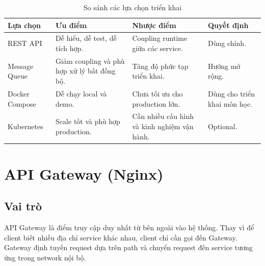 \documentclass[../main.tex]{subfiles}
\begin{document}
\begin{table}[H]
    \centering
    \caption{So sánh các lựa chọn triển khai}
    \label{tab:chapter4-architecture-discussion}
    \begin{tabular}{|p{}|p{}|p{}|p{}|}
        \hline
        \rowcolor{primary!35}
        \textbf{Lựa chọn} & \textbf{Ưu điểm} & \textbf{Nhược điểm} & \textbf{Quyết định} \\
        \hline
        REST API & Dễ hiểu, dễ test, dễ tích hợp. & Coupling runtime giữa các service. & Dùng chính. \\
        \hline
        Message Queue & Giảm coupling và phù hợp xử lý bất đồng bộ. & Tăng độ phức tạp triển khai. & Hướng mở rộng. \\
        \hline
        Docker Compose & Dễ chạy local và demo. & Chưa tối ưu cho production lớn. & Dùng cho triển khai môn học. \\
        \hline
        Kubernetes & Scale tốt và phù hợp production. & Cần nhiều cấu hình và kinh nghiệm vận hành. & Optional. \\
        \hline
    \end{tabular}
\end{table}

\section{API Gateway (Nginx)}
\label{section:4.3}

\subsection{Vai trò}
\label{subsection:4.3.1}

API Gateway là điểm truy cập duy nhất từ bên ngoài vào hệ thống. Thay vì để client biết nhiều địa chỉ service khác nhau, client chỉ cần gọi đến Gateway. Gateway định tuyến request dựa trên path và chuyển request đến service tương ứng trong network nội bộ.
\end{document}
